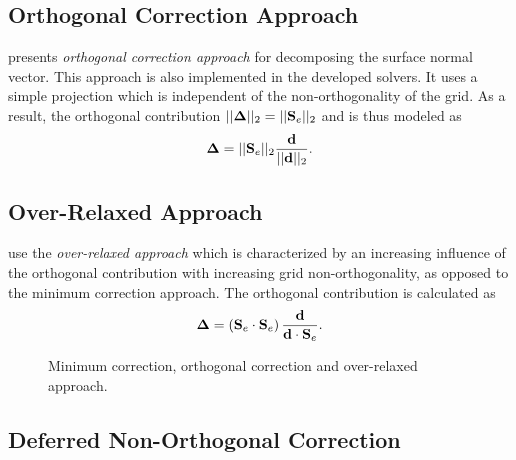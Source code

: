 \subsection{Orthogonal Correction Approach}
\label{seq:orthcorrapproach}

\cite{ferziger02} presents \emph{orthogonal correction approach} for decomposing the surface normal vector. This approach is also implemented in the developed solvers. It uses a simple projection which is independent of the non-orthogonality of the grid. As a result, the orthogonal contribution \(||\boldsymbol{\Delta}||_2 =  ||\mathbf{S}_e||_2\) and is thus modeled as 
\begin{displaymath}
  \boldsymbol{\Delta} =  || \mathbf{S}_e ||_2 \frac{\mathbf{d}}{ ||\mathbf{d}||_2}.
\end{displaymath}

\subsection{Over-Relaxed Approach}

\cite{jasak96,darwish09} use the \emph{over-relaxed approach} which is characterized by an increasing influence of the orthogonal contribution with increasing grid non-orthogonality, as opposed to the minimum correction approach. The orthogonal contribution is calculated as
\begin{displaymath}
  \boldsymbol{\Delta} =  \left( \mathbf{S}_e \cdot \mathbf{S}_e \right) \frac{\mathbf{d}}{ \mathbf{d} \cdot \mathbf{S}_e }.
\end{displaymath} 

\begin{figure}[h]
\hfil
{}
\hfil
{}
\caption{Minimum correction, orthogonal correction and over-relaxed approach.}
\label{fig:nonorth}
\end{figure}

\subsection{Deferred Non-Orthogonal Correction}


